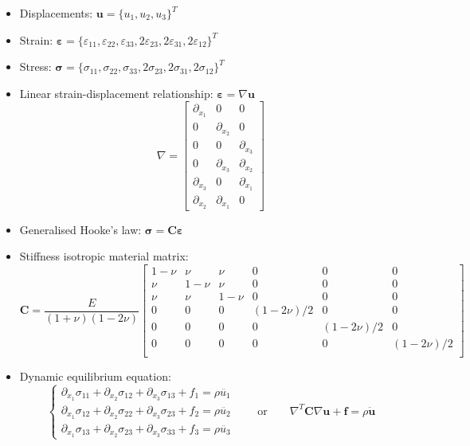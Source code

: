 \documentclass[12pt]{article}
\begin{document}
\begin{itemize}
      \item Displacements: $\mathbf u =\{u_{1}, u_{2},u_3\}^T$
      \item Strain:  $\boldsymbol\varepsilon =\{\varepsilon_{11}, \varepsilon_{22}, \varepsilon_{33}, 2\varepsilon_{23}, 2\varepsilon_{31}, 2\varepsilon_{12}\}^T$
      \item Stress: $\boldsymbol\sigma =\{\sigma_{11}, \sigma_{22}, \sigma_{33}, 2\sigma_{23}, 2\sigma_{31}, 2\sigma_{12}\}^T$
      \item Linear strain-displacement relationship: $\boldsymbol\varepsilon=\nabla\mathbf u$
            $$\nabla=\begin{bmatrix} \partial_{x_1} & 0 & 0 \\ 0 & \partial_{x_2} & 0 \\ 0 & 0 & \partial_{x_3} \\ 0 & \partial_{x_3} & \partial_{x_2} \\ \partial_{x_3} & 0 & \partial_{x_1}  \\ \partial_{x_2} & \partial_{x_1} & 0 \end{bmatrix}$$
      \item Generalised Hooke’s law: $\boldsymbol\sigma=\mathbf C\boldsymbol\varepsilon$
      \item Stiffness isotropic material matrix:
            $$\mathbf C=\frac{E}{(1+\nu)(1-2\nu)}
                  \begin{bmatrix}
                        1-\nu & \nu   & \nu   & 0          & 0          & 0          \\
                        \nu   & 1-\nu & \nu   & 0          & 0          & 0          \\
                        \nu   & \nu   & 1-\nu & 0          & 0          & 0          \\
                        0     & 0     & 0     & (1-2\nu)/2 & 0          & 0          \\
                        0     & 0     & 0     & 0          & (1-2\nu)/2 & 0          \\
                        0     & 0     & 0     & 0          & 0          & (1-2\nu)/2 \\
                  \end{bmatrix}$$
      \item Dynamic equilibrium equation:
            $$ \begin{cases}
                        \partial_{x_1}\sigma_{11} + \partial_{x_2}\sigma_{12} + \partial_{x_3}\sigma_{13}  + f_1 = \rho \ddot{u_{1}} \\
                        \partial_{x_1}\sigma_{12} +\partial_{x_2}\sigma_{22} + \partial_{x_3}\sigma_{23}  + f_2 = \rho \ddot{u_{2}}  \\
                        \partial_{x_1}\sigma_{13} +\partial_{x_2}\sigma_{23} + \partial_{x_3}\sigma_{33}  + f_3 = \rho \ddot{u_{3}}
                  \end{cases}
                  \qquad \text{or}\qquad \nabla^T\mathbf C\nabla\mathbf u + \mathbf f = \rho \ddot{\mathbf u}$$
\end{itemize}
\end{document}
